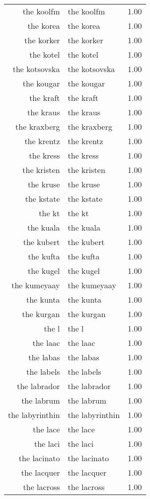 \begin{table}[ht]
\begin{tabular}{rlr}
  the koolfm & the koolfm & 1.00 \\ 
  the korea & the korea & 1.00 \\ 
  the korker & the korker & 1.00 \\ 
  the kotel & the kotel & 1.00 \\ 
  the kotsovska & the kotsovska & 1.00 \\ 
  the kougar & the kougar & 1.00 \\ 
  the kraft & the kraft & 1.00 \\ 
  the kraus & the kraus & 1.00 \\ 
  the kraxberg & the kraxberg & 1.00 \\ 
  the krentz & the krentz & 1.00 \\ 
  the kress & the kress & 1.00 \\ 
  the kristen & the kristen & 1.00 \\ 
  the kruse & the kruse & 1.00 \\ 
  the kstate & the kstate & 1.00 \\ 
  the kt & the kt & 1.00 \\ 
  the kuala & the kuala & 1.00 \\ 
  the kubert & the kubert & 1.00 \\ 
  the kufta & the kufta & 1.00 \\ 
  the kugel & the kugel & 1.00 \\ 
  the kumeyaay & the kumeyaay & 1.00 \\ 
  the kunta & the kunta & 1.00 \\ 
  the kurgan & the kurgan & 1.00 \\ 
  the l & the l & 1.00 \\ 
  the laac & the laac & 1.00 \\ 
  the labas & the labas & 1.00 \\ 
  the labels & the labels & 1.00 \\ 
  the labrador & the labrador & 1.00 \\ 
  the labrum & the labrum & 1.00 \\ 
  the labyrinthin & the labyrinthin & 1.00 \\ 
  the lace & the lace & 1.00 \\ 
  the laci & the laci & 1.00 \\ 
  the lacinato & the lacinato & 1.00 \\ 
  the lacquer & the lacquer & 1.00 \\ 
  the lacross & the lacross & 1.00 \\ 

\end{tabular}
\end{table}
